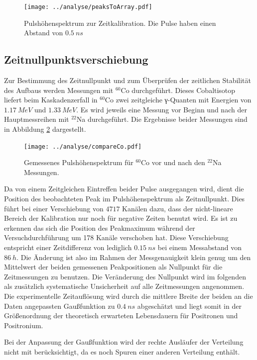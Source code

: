 \documentclass[a4paper,12pt]{article}
\begin{document}
\begin{figure}
	\texttt{[image: ../analyse/peaksToArray.pdf]}
	\caption{Pulshöhenspektrum zur Zeitkalibration. Die Pulse haben einen Abstand von $\SI{0.5}{ns}$}
	\label{fig:timepuls}
\end{figure}

\subsection{Zeitnullpunktsverschiebung}\label{cap:zeitverschiebung}

Zur Bestimmung des Zeitnullpunkt und zum Überprüfen der zeitlichen Stabilität des Aufbaus werden Messungen mit
$^{60}$Co durchgeführt.
Dieses Cobaltisotop liefert beim Kaskadenzerfall in $^{60}$Co zwei zeitgleiche γ-Quanten mit Energien von $\SI{1.17}{MeV}$ und $\SI{1.33}{MeV}$. Es wird jeweils eine Messung vor Beginn
und nach der Hauptmessreihen mit $^{22}$Na durchgeführt. Die Ergebnisse beider Messungen sind in Abbildung \ref{fig:compare_co} dargestellt.

\begin{figure}
	\texttt{[image: ../analyse/compareCo.pdf]}
	\caption{Gemessenes Pulshöhenspektrum für $^{60}$Co vor und nach den $^{22}$Na Messungen.}
	\label{fig:compare_co}
\end{figure}

Da von einem Zeitgleichen Eintreffen beider Pulse ausgegangen wird, dient die Position des beobachteten Peak im Pulshöhenspektrum als Zeitnullpunkt.
Dies führt bei einer Verschiebung von $4717$ Kanälen dazu, dass der nicht-lineare Bereich der
Kalibration nur noch für negative Zeiten benutzt wird.
Es ist zu erkennen das sich die Position des Peakmaximum während der Versuchdurchführung um 178 Kanäle verschoben hat. Diese Verschiebung entspricht einer
Zeitdifferenz von lediglich $\SI{0.15}{ns}$ bei einem Messabstand von $\SI{86}{h}$.
Die Änderung ist also im Rahmen der Messgenauigkeit klein genug um den Mittelwert der
beiden gemessenen Peakpositionen als Nullpunkt für die Zeitmessungen zu benutzen. Die Veränderung des Nullpunkt wird im folgenden
als zusätzlich systematische Unsicherheit auf alle Zeitmessungen angenommen. Die experimentelle Zeitauflösung wird durch die mittlere Breite der beiden an die
Daten angepassten Gaußfunktion zu $\SI{0.4}{ns}$ abgeschätzt und liegt somit in der Größenordnung der theoretisch erwarteten Lebensdauern für Positronen und Positronium.

Bei der Anpassung der Gaußfunktion wird der rechte Ausläufer der Verteilung nicht mit
berücksichtigt, da es noch Spuren einer anderen Verteilung enthält.
\end{document}
